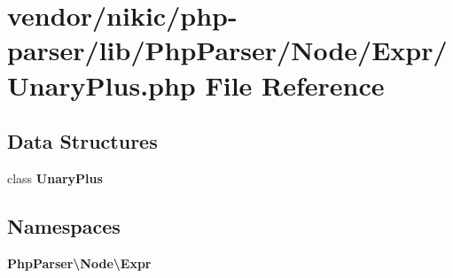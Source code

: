\section{vendor/nikic/php-\/parser/lib/\+Php\+Parser/\+Node/\+Expr/\+Unary\+Plus.php File Reference}
\label{_unary_plus_8php}
\subsection*{Data Structures}
\begin{DoxyCompactItemize}
\item 
class {\bf Unary\+Plus}
\end{DoxyCompactItemize}
\subsection*{Namespaces}
\begin{DoxyCompactItemize}
\item 
 {\bf Php\+Parser\textbackslash{}\+Node\textbackslash{}\+Expr}
\end{DoxyCompactItemize}
